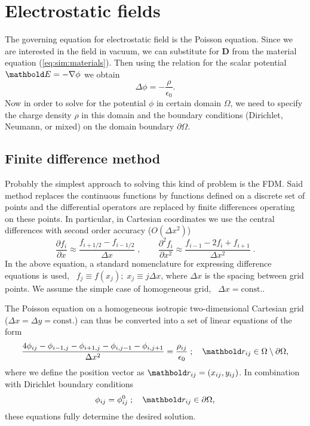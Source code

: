 \section{Electrostatic fields}

The governing equation for electrostatic field is the Poisson
equation. Since we are interested in the field in vacuum, we can substitute
for $\mathbold{D}$ from the material equation (\ref{eq:sim:materials}). Then using the relation for the scalar potential $\mb E = -\nabla \phi$ we obtain
\begin{equation}
\Delta\phi=-\frac{\rho}{\epsilon_{0}}\text{.}
\end{equation}
Now in order to solve for the potential $\phi$ in certain domain $\Omega$, we need to specify the
charge density $\rho$ in this domain and the boundary conditions (Dirichlet, Neumann, or mixed)
on the domain boundary $\partial\Omega$.

\subsection{Finite difference method}
Probably the simplest approach to solving this kind of problem is the \ac{FDM}.
Said method replaces the continuous functions by functions defined on a discrete set of points and
the differential operators are replaced by finite differences operating on these points.
In particular, in Cartesian coordinates we use the central differences with second order accuracy 
($O(\Delta x^2)$)
\begin{equation}
\frac{\partial f_i}{\partial x} \approx \frac{f_{i+1/2} - f_{i-1/2}}{\Delta x}\;,\qquad
\frac{\partial^2 f_i}{\partial x^2} \approx \frac{f_{i-1} - 2f_i + f_{i+1}}{\Delta x^2}\;.
\end{equation}
In the above equation, a standard nomenclature for expressing difference equations is used, \ie\ 
$f_j \equiv f(x_j);\; x_j \equiv j\Delta x$, where $\Delta x$ is the spacing between grid points.
We assume the simple case of homogeneous grid, \ie\ $\Delta x = \text{const.}$.

The Poisson equation on a homogeneous isotropic two-dimensional Cartesian grid ($\Delta x = \Delta y = \text{const.}$) can thus
be converted into a set of linear equations of the form
\begin{equation}
\frac{4\phi_{ij} - \phi_{i-1,j} - \phi_{i+1,j} - \phi_{i,j-1} - \phi_{i,j+1}}
    {\Delta x^2} = \frac{\rho_{ij}}{\epsilon_0}\;;\quad \mb r_{ij} \in \Omega\setminus\partial\Omega\text,
\label{eq_sim_poiscart}
\end{equation}
where we define the position vector as $\mb r_{ij} = (x_{ij}, y_{ij})$.
In combination with Dirichlet boundary conditions
\begin{equation}
\phi_{ij} = \phi^0_{ij}\;;\quad \mb r_{ij} \in \partial\Omega\text,
\label{eq_sim_boundary}
\end{equation}
these equations fully determine the desired solution.

